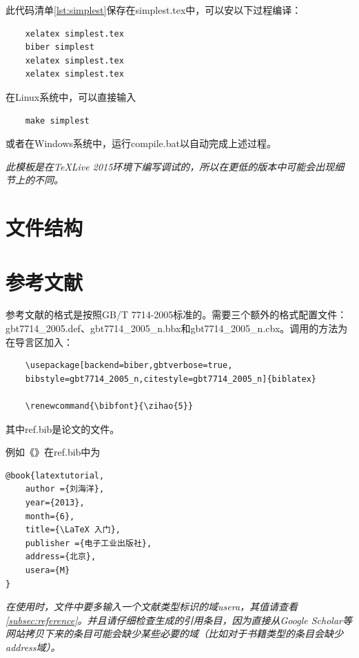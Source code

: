 \documentclass{LZU}
\renewcommand{\bibfont}{\zihao{5}}
\newenvironment{note}{\par\itshape\noindent{\makebox[-5pt][r]{\scriptsize\color{red!90}\textdbend\quad}}}{\par}
\newcommand{\filename}[1]{{\ttfamily #1}}
\begin{document}
\begingroup
    \label{lst:simplest}
    \inputminted[breaklines,frame=single,linenos]{latex}{simplest.tex}
\endgroup
此代码清单\ref{lst:simplest}保存在\filename{simplest.tex}中，可以安以下过程编译：
\begin{verbatim}
    xelatex simplest.tex
    biber simplest
    xelatex simplest.tex
    xelatex simplest.tex
\end{verbatim}
在Linux系统中，可以直接输入
\begin{verbatim}
    make simplest
\end{verbatim}
或者在Windows系统中，运行\filename{compile.bat}以自动完成上述过程。
\begin{note}
此模板是在TeXLive 2015环境下编写调试的，所以在更低的版本中可能会出现细节上的不同。
\end{note}

\section{文件结构}
\section{参考文献}
参考文献的格式是按照GB/T 7714-2005标准的。需要三个额外的格式配置文件：\filename{gbt7714\_2005.def}、\filename{gbt7714\_2005\_n.bbx}和\filename{gbt7714\_2005\_n.cbx}。调用的方法为在导言区加入：
\begin{verbatim}
    \usepackage[backend=biber,gbtverbose=true,
    bibstyle=gbt7714_2005_n,citestyle=gbt7714_2005_n]{biblatex}
    
    \renewcommand{\bibfont}{\zihao{5}}
\end{verbatim}
其中\filename{ref.bib}是论文的文件。

例如《》\cite{latextutorial}在\filename{ref.bib}中为
\begin{verbatim}
@book{latextutorial,
    author ={刘海洋},
    year={2013},
    month={6},
    title={\LaTeX 入门},
    publisher ={电子工业出版社},
    address={北京},
    usera={M}
}
\end{verbatim}
\begin{note}
    在使用时，文件中要多输入一个文献类型标识的域usera，其值请查看\cref{subsec:reference}。并且请仔细检查生成的引用条目，因为直接从Google Scholar等网站拷贝下来的条目可能会缺少某些必要的域（比如对于书籍类型的条目会缺少address域）。
\end{note}
\end{document}
